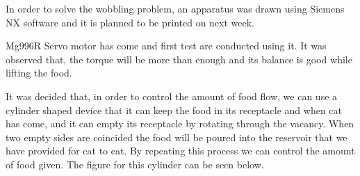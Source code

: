 In order to solve the wobbling problem, an apparatus was drawn using Siemens NX software and it is planned to be printed on next week. 

Mg996R Servo motor has come and first test are conducted using it. It was observed that, the torque will be more than enough and its balance is good while lifting the food. 

It was decided that, in order to control the amount of food flow, we can use a cylinder shaped device that it can keep the food in its receptacle and when cat has come, and it can empty its receptacle by rotating through the vacancy. When two empty sides are coincided the food will be poured into the reservoir that we have provided for cat to eat. By repeating this process we can control the amount of food given. The figure for this cylinder can be seen below. 

